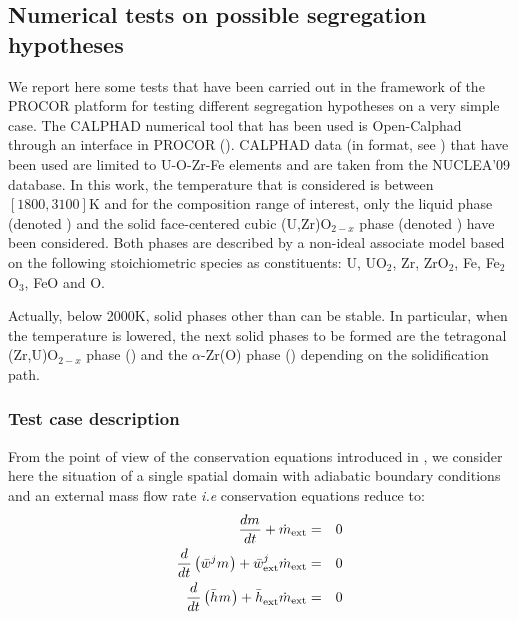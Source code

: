 \subsection{Numerical tests on possible segregation hypotheses} \label{sect:num}

We report here some tests that have been carried out in the framework of the PROCOR platform for testing different segregation hypotheses on a very simple case. The CALPHAD numerical tool that has been used is Open-Calphad through an interface in PROCOR (\cite{Sundman2016}). CALPHAD data (in  format, see \cite{TDB}) that have been used are limited to U-O-Zr-Fe elements and are taken from the NUCLEA'09 database. In this work, the temperature that is considered is between $[1800, 3100]$K and for the composition range of interest, only the liquid phase (denoted ) and the solid face-centered cubic (U,Zr)O$_{2-x}$ phase (denoted ) have been considered. Both phases are described by a non-ideal associate model based on the following stoichiometric species as 
constituents: U, UO$_2$, Zr, ZrO$_2$, Fe, Fe$_2$O$_3$, FeO and O.

\begin{remark}{} 
Actually, below 2000K, solid phases other than  can be stable. In particular, when the temperature is lowered, the next solid phases to be formed are the tetragonal (Zr,U)O$_{2-x}$ phase () and the $\alpha$-Zr(O) phase () depending on the solidification path.
\end{remark}

\subsubsection{Test case description}

From the point of view of the conservation equations introduced in , we consider here the situation of a single spatial domain with adiabatic boundary conditions and an external mass flow rate \textit{i.e} conservation equations reduce to:
\begin{eqnarray}
 \frac{d\mass{}}{dt} + \dot{m}_{\textrm{ext}} &=& 0 \label{eq:bulk_m1}\\
 \frac{d}{dt} \left( \avMassFraction[j]{} \mass{} \right) + \avMassFraction[j]{\textrm{ext}} \dot{m}_{\textrm{ext}} &=& 0 \label{eq:bulk_w1} \\
 \frac{d}{dt} \left( \avMassEnthalpy{} \mass{} \right) + \avMassEnthalpy{\textrm{ext}} \dot{m}_{\textrm{ext}} &=& 0  \label{eq:bulk_h1}
\end{eqnarray}

